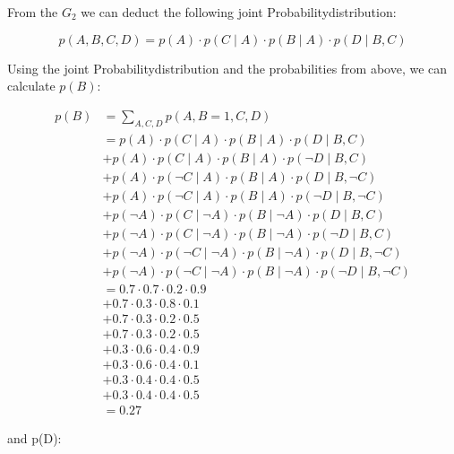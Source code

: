 \documentclass{article}
\begin{document}
From the $G_2$ we can deduct the following joint Probabilitydistribution:

\[
p(A,B,C,D)= p(A) \cdot p(C \mid A) \cdot p(B \mid A) \cdot p(D \mid B,C)    
\]

Using the joint Probabilitydistribution and the probabilities from above, we can calculate $p(B)$:

\begin{align*}
p(B)    &= \sum_{A,C,D} p(A,B=1,C, D) \\
        &= p(A) \cdot p(C \mid A) \cdot p(B \mid A) \cdot p(D \mid B,C) \\
        &+ p(A) \cdot p(C \mid A) \cdot p(B \mid A) \cdot p(\neg D \mid B,C) \\
        &+ p(A) \cdot p(\neg C \mid A) \cdot p(B \mid A) \cdot p(D \mid B,\neg C) \\
        &+ p(A) \cdot p(\neg C \mid A) \cdot p(B \mid A) \cdot p(\neg D \mid B,\neg C) \\
        &+ p(\neg A) \cdot p(C \mid \neg A) \cdot p(B \mid \neg A) \cdot p(D \mid B,C) \\
        &+ p(\neg A) \cdot p(C \mid \neg A) \cdot p(B \mid \neg A) \cdot p(\neg D \mid B,C) \\
        &+ p(\neg A) \cdot p(\neg C \mid \neg A) \cdot p(B \mid \neg A) \cdot p(D \mid B,\neg C) \\
        &+ p(\neg A) \cdot p(\neg C \mid \neg A) \cdot p(B \mid \neg A) \cdot p(\neg D \mid B,\neg C) \\
        &= 0.7 \cdot 0.7 \cdot 0.2 \cdot 0.9\\
        &+ 0.7 \cdot 0.3 \cdot 0.8 \cdot 0.1 \\
        &+ 0.7 \cdot 0.3\cdot 0.2\cdot 0.5 \\
        &+ 0.7 \cdot 0.3 \cdot 0.2 \cdot 0.5 \\
        &+ 0.3 \cdot 0.6 \cdot 0.4 \cdot 0.9 \\
        &+ 0.3\cdot 0.6 \cdot 0.4\cdot 0.1 \\
        &+ 0.3 \cdot 0.4 \cdot 0.4 \cdot 0.5 \\
        &+ 0.3\cdot 0.4 \cdot 0.4 \cdot 0.5 \\
        &= 0.27
\end{align*}

and p(D):
\end{document}
